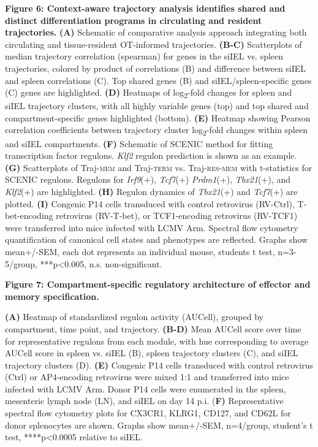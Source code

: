 \textbf{Figure 6: Context-aware trajectory analysis identifies shared
and distinct differentiation programs in circulating and resident
trajectories.} \textbf{(A)} Schematic of comparative analysis approach
integrating both circulating and tissue-resident OT-informed
trajectories. \textbf{(B-C)} Scatterplots of median trajectory
correlation (spearman) for genes in the siIEL vs. spleen trajectories,
colored by product of correlations (B) and difference between siIEL and
spleen correlations (C). Top shared genes (B) and siIEL/spleen-specific
genes (C) genes are highlighted. \textbf{(D)} Heatmaps of
log\textsubscript{2}-fold changes for spleen and siIEL trajectory
clusters, with all highly variable genes (top) and top shared and
compartment-specific genes highlighted (bottom). \textbf{(E)} Heatmap
showing Pearson correlation coefficients between trajectory cluster
log\textsubscript{2}-fold changes within spleen and siIEL compartments.
\textbf{(F)} Schematic of SCENIC method for fitting transcription factor
regulons. \emph{Klf2} regulon prediction is shown as an example.
\textbf{(G)} Scatterplots of Traj\textsc{-mem} and Traj\textsc{-term}
vs. Traj\textsc{-res-mem} with t-statistics for SCENIC regulons.
Regulons for \emph{Irf9}(+), \emph{Tcf7}(+) \emph{Prdm1}(+),
\emph{Tbx21}(+), and \emph{Klf2}(+) are highlighted. \textbf{(H)}
Regulon dynamics of \emph{Tbx21}(+) and \emph{Tcf7}(+) are plotted.
\textbf{(I)} Congenic P14 cells transduced with control retrovirus
(RV-Ctrl), T-bet-encoding retrovirus (RV-T-bet), or TCF1-encoding
retrovirus (RV-TCF1) were transferred into mice infected with LCMV Arm.
Spectral flow cytometry quantification of canonical cell states and
phenotypes are reflected. Graphs show mean+/-SEM, each dot represents an
individual mouse, students t test, n=3-5/group, ***p\textless{}0.005,
n.s. non-significant.

\textbf{Figure 7: Compartment-specific regulatory architecture of
effector and memory specification. }

\textbf{(A)} Heatmap of standardized regulon activity (AUCell), grouped
by compartment, time point, and trajectory. \textbf{(B-D)} Mean AUCell
score over time for representative regulons from each module, with hue
corresponding to average AUCell score in spleen vs. siIEL (B), spleen
trajectory clusters (C), and siIEL trajectory clusters (D). \textbf{(E)}
Congenic P14 cells transduced with control retrovirus (Ctrl) or
AP4-encoding retrovirus were mixed 1:1 and transferred into mice
infected with LCMV Arm. Donor P14 cells were enumerated in the spleen,
mesenteric lymph node (LN), and siIEL on day 14 p.i. (\textbf{F)}
Representative spectral flow cytometry plots for CX3CR1, KLRG1, CD127,
and CD62L for donor splenocytes are shown. Graphs show mean+/-SEM,
n=4/group, student's t test, ****p\textless{}0.0005 relative to siIEL.

